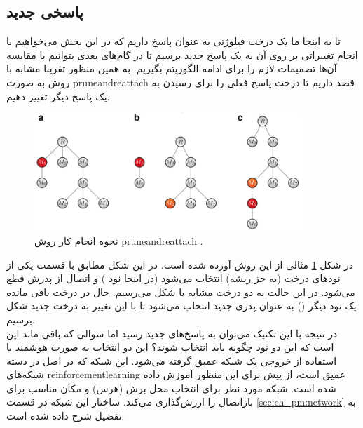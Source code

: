 \subsection{پاسخی جدید}
تا به اینجا ما یک درخت فیلوژنی به عنوان پاسخ داریم که در این بخش می‌خواهیم با انجام تغییراتی بر روی آن به یک پاسخ جدید برسیم تا در گام‌های بعدی بتوانیم با مقایسه آن‌ها تصمیمات لازم را برای ادامه الگوریتم بگیریم. به همین منظور تقریبا مشابه با روش \cite{davis2016computing} به صورت \gls{pruneandreattach} قصد داریم تا درخت پاسخ فعلی را برای رسیدن به یک پاسخ دیگر تغییر دهیم. 
\begin{figure}[!ht]
	\centering 
	\includegraphics[width=0.9\textwidth]{img/chaps/pm/pruneandreattach}
	\caption{نحوه انجام کار روش \gls{pruneandreattach} \cite{davis2016computing}.}    
	\label{fig:ch_pm:pruneandreattach}
\end{figure}
در شکل \ref{fig:ch_pm:pruneandreattach} مثالی از این روش آورده شده است. در این شکل مطابق با قسمت  یکی از نودهای درخت (به جز ریشه) انتخاب می‌شود (در اینجا نود ) و اتصال از پدرش قطع می‌شود. در این حالت به دو درخت مشابه با شکل  می‌رسیم. حال در درخت باقی مانده یک نود دیگر  () به عنوان پدری جدید انتخاب می‌شود تا با این تغییر به درخت جدید شکل  برسیم.
\\
در نتیجه با این تکنیک می‌توان به پاسخ‌های جدید رسید اما سوالی که باقی ماند این است که این دو نود چگونه باید انتخاب شوند؟ 
این دو انتخاب به صورت هوشمند با استفاده از خروجی یک شبکه عمیق گرفته می‌شود. این شبکه که در اصل در دسته شبکه‌های \gls{reinforcementlearning} عمیق است، از پیش برای این منظور آموزش داده شده‌ است.
%		
شبکه مورد نظر برای انتخاب محل برش (هرس) و مکان مناسب برای بازاتصال را ارزش‌گذاری می‌کند. ساختار این شبکه در قسمت \ref{sec:ch_pm:network} به تفضیل شرح داده شده است.

